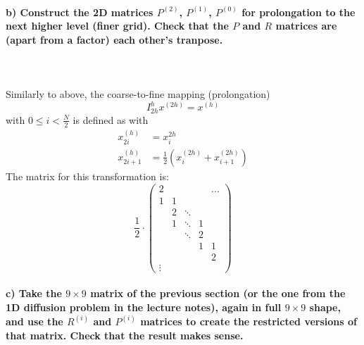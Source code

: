 \paragraph{
    b) Construct the 2D matrices $P^{(2)}$, $P^{(1)}$, $P^{(0)}$ 
    for 
    prolongation to the next higher level (finer grid). Check that 
    the $P$ and $R$ matrices are (apart from a factor) each other’s 
    tranpose.
} \ \\
    \\
    Similarly to above, the coarse-to-fine mapping (prolongation)
    \begin{equation}
        I_{2h}^h x^{(2h)}=x^{(h)}
    \end{equation}
    with $0\leq i<\frac{N}{2}$ is defined as with
    \begin{align}
            x_{2i}^{(h)}
            &=x_i^{2h} \\
            x_{2i+1}^{(h)}
            &=\frac{1}{2}(x_i^{(2h)}+x_{i+1}^{(2h)})
    \end{align}
    The matrix for this transformation is:
    \begin{equation}
        \frac{1}{2}\cdot
        \begin{pmatrix}
            2      &   &        &   & \hdots \\
            1      & 1 &        &   &        \\
                   & 2 & \ddots &   &        \\
                   & 1 & \ddots & 1 &        \\
                   &   & \ddots & 2 &        \\
                   &   &        & 1 & 1      \\
                   &   &        &   & 2      \\
            \vdots
        \end{pmatrix}
    \end{equation}


\paragraph{
    c) Take the $9\times9$ matrix of the previous section (or the one 
    from the 1D diffusion problem in the lecture notes), again in full 
    $9\times9$ shape, and use the $R^{(i)}$ and $P^{(i)}$ matrices to 
    create the restricted versions of that matrix. 
    Check that the result makes sense.
} \ \\
    \\

